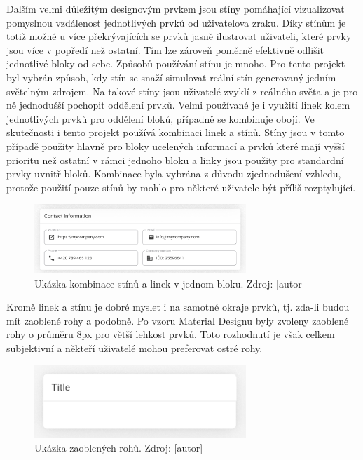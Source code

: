 		Dalším velmi důležitým designovým prvkem jsou stíny pomáhající vizualizovat pomyslnou vzdálenost jednotlivých
		prvků od uživatelova zraku.
		Díky stínům je totiž možné u více překrývajících se prvků jasně ilustrovat uživateli, které prvky jsou více v
		popředí než ostatní.
		Tím lze zároveň poměrně efektivně odlišit jednotlivé bloky od sebe.
		Způsobů používání stínu je mnoho.
		Pro tento projekt byl vybrán způsob, kdy stín se snaží simulovat reální stín generovaný jedním světelným zdrojem.
		Na takové stíny jsou uživatelé zvyklí z reálného světa a je pro ně jednodušší pochopit oddělení prvků.
		Velmi používané je i využití linek kolem jednotlivých prvků pro oddělení bloků, případně se kombinuje obojí.
		Ve skutečnosti i tento projekt používá kombinaci linek a stínů.
		Stíny jsou v tomto případě použity hlavně pro bloky ucelených informací a prvků které mají vyšší prioritu než
		ostatní v rámci jednoho bloku a linky jsou použity pro standardní prvky uvnitř bloků.
		Kombinace byla vybrána z důvodu zjednodušení vzhledu, protože použití pouze stínů by mohlo pro některé uživatele
		být příliš rozptylující.

		\begin{figure}[H]
			\centering
			\includegraphics[width=8cm]{obrazky/ukazka_stinu_a_linek}
			\caption{Ukázka kombinace stínů a linek v jednom bloku. Zdroj: [autor]}
		\end{figure}

		Kromě linek a stínu je dobré myslet i na samotné okraje prvků, tj. zda-li budou mít zaoblené rohy a podobně.
		Po vzoru Material Designu byly zvoleny zaoblené rohy o průměru 8px pro větší lehkost prvků.
		Toto rozhodnutí je však celkem subjektivní a někteří uživatelé mohou preferovat ostré rohy.

		\begin{figure}[H]
			\centering
			\includegraphics[width=8cm]{obrazky/blok_obsahu}\hfill
			\caption{Ukázka zaoblených rohů. Zdroj: [autor]}
		\end{figure}

